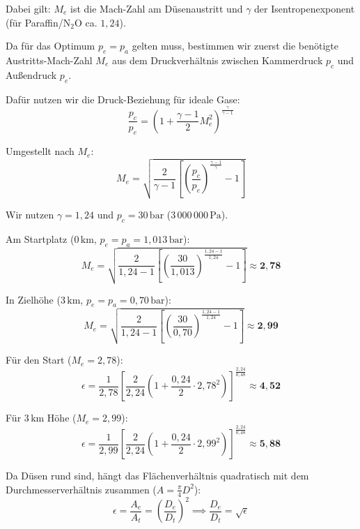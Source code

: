 \documentclass{scrartcl}
\begin{document}
Dabei gilt: $M_{e}$ ist die Mach-Zahl am Düsenaustritt und $\gamma$ der Isentropenexponent (für Paraffin/N$_2$O ca. $1{,}24$).

Da für das Optimum $p_e = p_a$ gelten muss, bestimmen wir zuerst die benötigte Austritts-Mach-Zahl $M_{e}$ aus dem Druckverhältnis zwischen Kammerdruck $p_{c}$ und Außendruck $p_{e}$.

Dafür nutzen wir die Druck-Beziehung für ideale Gase:
\begin{equation}
\frac{p_{c}}{p_{e}}=\left(1+\frac{\gamma -1}{2}M_{e}^{2}\right)^{\frac{\gamma }{\gamma -1}}
\end{equation}

Umgestellt nach $M_{e}$:
\begin{equation}
M_{e}=\sqrt{\frac{2}{\gamma -1}\left[\left(\frac{p_{c}}{p_{e}}\right)^{\frac{\gamma -1}{\gamma }}-1\right]}
\end{equation}

Wir nutzen $\gamma = 1{,}24$ und $p_c = 30\,\text{bar}$ ($3\,000\,000\,\text{Pa}$).

Am Startplatz ($0\,\text{km}$, $p_e = p_a = 1{,}013\,\text{bar}$):
\begin{equation*}
M_{e}=\sqrt{\frac{2}{1{,}24-1}\left[\left(\frac{30}{1{,}013}\right)^{\frac{1{,}24-1}{1{,}24}}-1\right]}\approx \mathbf{2{,}78}
\end{equation*}

In Zielhöhe ($3\,\text{km}$, $p_e = p_a = 0{,}70\,\text{bar}$):
\begin{equation*}
M_{e}=\sqrt{\frac{2}{1{,}24-1}\left[\left(\frac{30}{0{,}70}\right)^{\frac{1{,}24-1}{1{,}24}}-1\right]}\approx \mathbf{2{,}99}
\end{equation*}

Für den Start ($M_e = 2{,}78$):
\begin{equation*}
\epsilon =\frac{1}{2{,}78}\left[\frac{2}{2{,}24}\left(1+\frac{0{,}24}{2}\cdot 2{,}78^{2}\right)\right]^{\frac{2{,}24}{0{,}48}}\approx \mathbf{4{,}52}
\end{equation*}

Für $3\,\text{km}$ Höhe ($M_e = 2{,}99$):
\begin{equation*}
\epsilon =\frac{1}{2{,}99}\left[\frac{2}{2{,}24}\left(1+\frac{0{,}24}{2}\cdot 2{,}99^{2}\right)\right]^{\frac{2{,}24}{0{,}48}}\approx \mathbf{5{,}88}
\end{equation*}

Da Düsen rund sind, hängt das Flächenverhältnis quadratisch mit dem Durchmesserverhältnis zusammen ($A = \frac{\pi}{4} D^2$):
\begin{equation}
\epsilon =\frac{A_{e}}{A_{t}}=\left(\frac{D_{e}}{D_{t}}\right)^{2}\implies \frac{D_{e}}{D_{t}}=\sqrt{\epsilon }
\end{equation}
\end{document}
